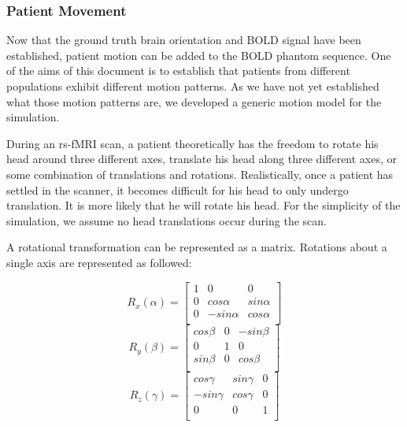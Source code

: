 \subsubsection{Patient Movement}

Now that the ground truth brain orientation and BOLD signal have been established, patient motion can be added to the BOLD phantom sequence. One of the aims of this document is to establish that patients from different populations exhibit different motion patterns. As we have not yet established what those motion patterns are, we developed a generic motion model for the simulation.

During an rs-fMRI scan, a patient theoretically has the freedom to rotate his head around three different axes, translate his head along three different axes, or some combination of translations and rotations. Realistically, once a patient has settled in the scanner, it becomes difficult for his head to only undergo translation. It is more likely that he will rotate his head. For the simplicity of the simulation, we assume no head translations occur during the scan.

A rotational transformation can be represented as a matrix. Rotations about a single axis are represented as followed:

\begin{equation}
R_x(\alpha) = \begin{bmatrix}
 1 &  0          & 0     \\ 
 0 &  cos\alpha  & sin\alpha \\ 
 0 &  -sin\alpha & cos\alpha \\ 
\end{bmatrix}
\end{equation}
\begin{equation}
R_y(\beta) = \begin{bmatrix}
 cos\beta &  0 & -sin\beta \\ 
 0        &  1 & 0         \\ 
 sin\beta &  0 & cos\beta  \\ 
\end{bmatrix}
\end{equation}
\begin{equation}
R_z(\gamma) = \begin{bmatrix}
 cos\gamma  & sin\gamma  & 0 \\ 
 -sin\gamma & cos\gamma  & 0 \\ 
 0          & 0          & 1 \\ 
\end{bmatrix}
\end{equation}

